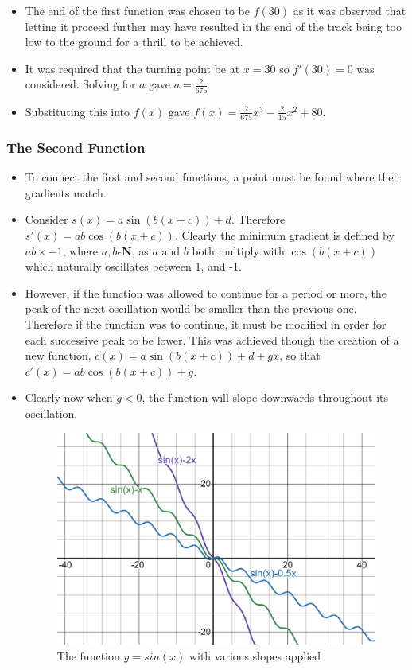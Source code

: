 \documentclass[11pt, letterpaper]{article}
\begin{document}
\begin{itemize}
	

	\item The end of the first function was chosen to be $f(30)$ as it was observed that letting it proceed further may have resulted in the end of the track being too low to the ground for a thrill to be achieved.
	\item It was required that the turning point be at $x=30$ so $f'(30)=0$ was considered. Solving for $a$ gave $a=\frac{2}{675}$
	\item Substituting this into $f(x)$ gave $f(x)=\frac{2}{675}x^{3}-\frac{2}{15}x^{2}+80$.
\end{itemize}
\subsubsection{The Second Function}
\begin{itemize}
	\item To connect the first and second functions, a point must be found where their gradients match.
	\item Consider $s(x)=a\sin(b(x+c))+d$. Therefore $s'(x)=ab\cos(b(x+c))$. Clearly the minimum gradient is defined by $ab\times-1$, where $a,b \epsilon \mathbf{N}$, as $a$ and $b$ both multiply with $\cos(b(x+c))$ which naturally oscillates between 1, and -1.
	\item However, if the function was allowed to continue for a period or more, the peak of the next oscillation would be smaller than the previous one. Therefore if the function was to continue, it must be modified in order for each successive peak to be lower. This was achieved though the creation of a new function, $c(x)=a\sin(b(x+c))+d+gx$, so that $c'(x)=ab\cos(b(x+c))+g$.
	\item Clearly now when $g<0$, the function will slope downwards throughout its oscillation. 

	\begin{figure}[h]
		\centering
		\includegraphics[width=15cm]{c(x).png}
		\caption{The function $y=sin(x)$ with various slopes applied}
	\end{figure}
	

\end{itemize}
\end{document}
